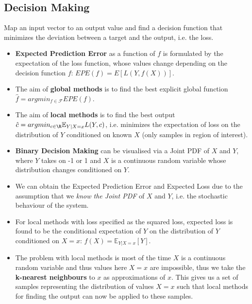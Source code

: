 \documentclass[english]{latex4ei/latex4ei_sheet}
\begin{document}
\begin{sectionbox}
\subsection{Decision Making}
Map an input vector to an output value and find a decision function that minimizes the deviation between a target and the output, i.e. the loss.
\begin{itemize}
    \item \textbf{Expected Prediction Error} as a function of $f$ is formulated by the expectation of the loss function, whose values change depending on the decision function $f$: $EPE(f)=E[L(Y, f(X))]$.
    \item The aim of \textbf{global methods} is to find the best explicit global function $\hat{f}=argmin_{f\in\mathcal{F}} EPE(f)$.
    \item The aim of \textbf{local methods} is to find the best output $\hat{c}=argmin_{c\in\R}\mathbb{E}_{Y|X=x}L(Y,c)$, i.e. minimizes the expectation of loss on the distribution of $Y$ conditioned on known $X$ (only samples in region of interest).
    \item \textbf{Binary Decision Making} can be visualised via a Joint PDF of $X$ and $Y$, where $Y$ takes on -1 or 1 and $X$  is a continuous random variable whose distribution changes conditioned on $Y$.
    \item We can obtain the Expected Prediction Error and Expected Loss due to the assumption that we \emph{know the Joint PDF} of $X$ and $Y$, i.e. the stochastic behaviour of the system.
    \item For local methods with loss specified as the squared loss, expected loss is found to be the conditional expectation of $Y$ on the distribution of $Y$ conditioned on $X=x$: $f(X)=\mathbb{E}_{Y|X=x}[Y]$.
    \item The problem with local methods is most of the time $X$ is a continuous random variable and thus values here $X=x$ are impossible, thus we take the \textbf{k-nearest neighbours} to $x$ as approximations of $x$. This gives us a set of samples representing the distribution of values $X=x$ such that local methods for finding the output can now be applied to these samples.
\end{itemize}
\end{sectionbox}
\end{document}
